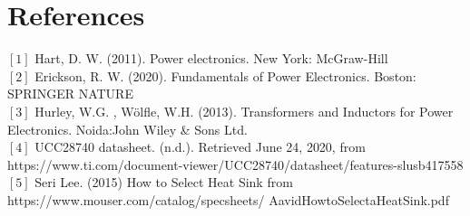 \section{References}
 $[1]$ Hart, D. W. (2011). Power electronics. New York: McGraw-Hill\\
 $[2]$ Erickson, R. W. (2020). Fundamentals of Power Electronics. Boston: SPRINGER NATURE\\
 $[3]$ Hurley, W.G. , Wölfle, W.H. (2013). Transformers and Inductors for Power Electronics. Noida:John Wiley & Sons Ltd. \\
 $[4]$ UCC28740 datasheet. (n.d.). Retrieved June 24, 2020, from https://www.ti.com/document-viewer/UCC28740/datasheet/features-slusb417558\\
 $[5]$ Seri Lee. (2015) How to Select Heat Sink from https://www.mouser.com/catalog/specsheets/ AavidHowtoSelectaHeatSink.pdf\\
